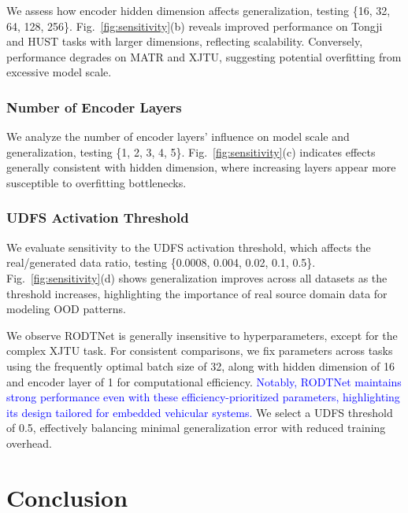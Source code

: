 \documentclass[lettersize,journal]{IEEEtran}
\newcommand{\rev}[1]{\textcolor{blue}{#1}}
\begin{document}
We assess how encoder hidden dimension affects generalization, testing \{16, 32, 64, 128, 256\}. Fig.~\ref{fig:sensitivity}(b) reveals improved performance on Tongji and HUST tasks with larger dimensions, reflecting scalability. Conversely, performance degrades on MATR and XJTU, suggesting potential overfitting from excessive model scale.

\subsubsection{Number of Encoder Layers}

We analyze the number of encoder layers' influence on model scale and generalization, testing \{1, 2, 3, 4, 5\}. Fig.~\ref{fig:sensitivity}(c) indicates effects generally consistent with hidden dimension, where increasing layers appear more susceptible to overfitting bottlenecks.

\subsubsection{UDFS Activation Threshold}

We evaluate sensitivity to the UDFS activation threshold, which affects the real/generated data ratio, testing \{0.0008, 0.004, 0.02, 0.1, 0.5\}. Fig.~\ref{fig:sensitivity}(d) shows generalization improves across all datasets as the threshold increases, highlighting the importance of real source domain data for modeling OOD patterns.

We observe RODTNet is generally insensitive to hyperparameters, except for the complex XJTU task. For consistent comparisons, we fix parameters across tasks using the frequently optimal batch size of 32, along with hidden dimension of 16 and encoder layer of 1 for computational efficiency. \rev{Notably, RODTNet maintains strong performance even with these efficiency-prioritized parameters, highlighting its design tailored for embedded vehicular systems.} We select a UDFS threshold of 0.5, effectively balancing minimal generalization error with reduced training overhead.  

\section{Conclusion}
\end{document}
